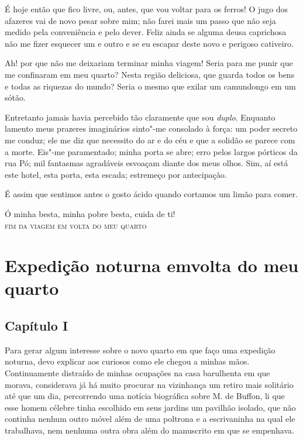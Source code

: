  É hoje então que fico livre, ou, antes, que vou voltar para os ferros!
O jugo dos afazeres vai de novo pesar sobre mim; não farei mais um
passo que não seja medido pela conveniência e pelo dever. Feliz
ainda se alguma deusa caprichosa não me fizer esquecer um e outro e se
eu escapar deste novo e perigoso cativeiro.

 Ah! por que não me deixariam terminar minha viagem! Seria para me punir
que me confinaram em meu quarto? Nesta região deliciosa, que guarda
todos os bens e todas as riquezas do mundo? Seria o mesmo que exilar um
camundongo em um sótão.  

 Entretanto jamais havia percebido tão claramente que sou
\textit{duplo}. Enquanto lamento meus prazeres imaginários sinto"-me
consolado à força: um poder secreto me conduz; ele me diz que necessito
do ar e do céu e que a solidão se parece com a morte. Eis"-me
paramentado; minha porta se abre; erro pelos largos pórticos da rua Pó;
mil fantasmas agradáveis esvoaçam diante dos meus olhos. Sim, aí está
este hotel, esta porta,  esta escada; estremeço por \mbox{antecipação.}

É assim que sentimos antes o gosto ácido quando cortamos um limão para
comer. 

Ó minha besta, minha pobre besta, cuida de ti!
\ \\

\hfil\textsc{fim da viagem em volta do meu quarto}

\chapter[Expedição noturna em volta do meu quarto]{Expedição noturna em\break volta do meu quarto}

\section*{Capítulo I}

Para gerar algum interesse sobre o novo quarto em que faço uma expedição
noturna, devo explicar aos curiosos como ele chegou a minhas mãos.
Continuamente distraído de minhas ocupações na casa barulhenta em que
morava, considerava já há muito procurar na vizinhança um retiro mais
solitário até que um dia, percorrendo uma notícia biográfica sobre M.
de Buffon, li que esse homem célebre tinha escolhido em seus jardins um
pavilhão isolado, que não continha nenhum outro móvel além de uma
poltrona e a escrivaninha na qual ele trabalhava, nem nenhuma outra
obra além do manuscrito em que se empenhava. 

